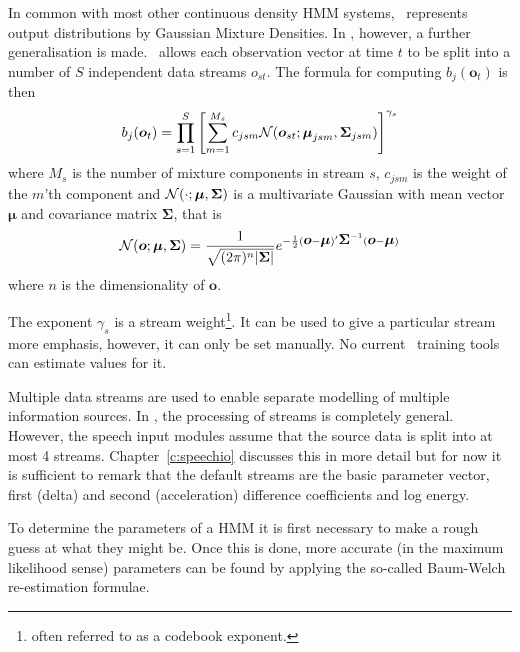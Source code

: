 In common with most other
continuous density HMM systems, \HTK\ represents output distributions
by Gaussian Mixture Densities.  
In \HTK, however, a further
generalisation is made.  \HTK\ allows each observation vector at time $t$
to be split into a number of $S$ independent data streams $o_{st}$.  The
formula for computing $b_{j}(\bm{o}_t)$ is then
\begin{equation} \label{e:8}
  b_{j}({\mbox{\boldmath $o$}}_t) = \prod_{s=1}^S \left[
     \sum_{m=1}^{M_s} c_{jsm} {\cal N}({\mbox{\boldmath $o$}}_{st};
                    {\mbox{\boldmath $\mu$}}_{jsm}, {\mbox{\boldmath $\Sigma$}}_{jsm})
  \right]^{\gamma_s}
\end{equation}
where $M_s$ is the number of mixture components in stream $s$, $c_{jsm}$
is the weight of the $m$'th component and 
${\cal N}(\cdot; {\mbox{\boldmath $\mu$}}, {\mbox{\boldmath $\Sigma$}})$ is a multivariate Gaussian with
mean vector $\bm{\mu}$ and covariance matrix $\bm{\Sigma}$,
that is
\begin{equation}
{\cal N}({\mbox{\boldmath $o$}}; {\mbox{\boldmath $\mu$}}, {\mbox{\boldmath $\Sigma$}}) =
       \frac{1}{\sqrt{(2 \pi)^n | {\mbox{\boldmath $\Sigma$}} |}} 
       e^{- \frac{1}{2}({\mbox{\boldmath $o$}}-{\mbox{\boldmath $\mu$}})' {\mbox{\boldmath $\Sigma$}}^{-1}({\mbox{\boldmath $o$}}-{\mbox{\boldmath $\mu$}})}
\end{equation}
where $n$ is the dimensionality of $\bm{o}$.

The exponent $\gamma_s$ is a stream weight\footnote{often 
referred to as a codebook exponent.}.  It 
can be used to give a particular stream more emphasis, however,
it can only be set manually.  No current \HTK\ training tools 
can estimate values for it. 

Multiple data streams are used to
enable separate modelling of multiple information sources.  In
\HTK, the processing of streams is completely general.  However,
the speech input modules assume that the 
source data is split into at most 4 streams.  Chapter~\ref{c:speechio}
discusses this in more detail but for now it is sufficient to
remark that the default streams are the
basic parameter vector, first (delta) and second (acceleration)
difference coefficients and log energy.


To determine the parameters of a HMM it is first necessary to make
a rough guess at what they might be.  Once this is done, more
accurate (in the maximum likelihood sense) parameters
can be found by applying the so-called 
Baum-Welch re-estimation
formulae.  

